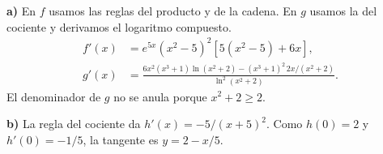 \textbf{a)} En $f$ usamos las reglas del producto y de la cadena.
En $g$ usamos la del cociente y derivamos el logaritmo compuesto.
\[
\begin{aligned}
f'(x)&=e^{5x}(x^2-5)^2[5(x^2-5)+6x],\\
g'(x)&=\frac{6x^2(x^3+1)\ln(x^2+2)-(x^3+1)^2\,2x/(x^2+2)}
{\ln^2(x^2+2)}.
\end{aligned}
\]
El denominador de $g$ no se anula porque $x^2+2\ge2$.

\textbf{b)} La regla del cociente da $h'(x)=-5/(x+5)^2$.
Como $h(0)=2$ y $h'(0)=-1/5$, la tangente es
$\boxed{y=2-x/5}$.
